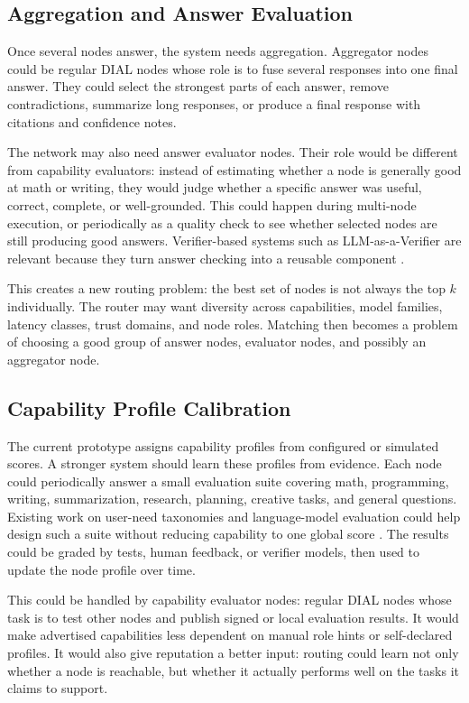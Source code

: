 \subsection{Aggregation and Answer Evaluation}

Once several nodes answer, the system needs aggregation. Aggregator nodes could
be regular DIAL nodes whose role is to fuse several responses into one final
answer. They could select the strongest parts of each answer, remove
contradictions, summarize long responses, or produce a final response with
citations and confidence notes.

The network may also need answer evaluator nodes. Their role would be different
from capability evaluators: instead of estimating whether a node is generally
good at math or writing, they would judge whether a specific answer was useful,
correct, complete, or well-grounded. This could happen during multi-node
execution, or periodically as a quality check to see whether selected nodes are
still producing good answers. Verifier-based systems such as LLM-as-a-Verifier
are relevant because they turn answer checking into a reusable component
\citep{kwok2026llmverifier}.

This creates a new routing problem: the best set of nodes is not always the top
\(k\) individually. The router may want diversity across capabilities, model
families, latency classes, trust domains, and node roles. Matching then becomes
a problem of choosing a good group of answer nodes, evaluator nodes, and
possibly an aggregator node.

\subsection{Capability Profile Calibration}

The current prototype assigns capability profiles from configured or simulated
scores. A stronger system should learn these profiles from evidence. Each node
could periodically answer a small evaluation suite covering math, programming,
writing, summarization, research, planning, creative tasks, and general
questions. Existing work on user-need taxonomies and language-model evaluation
could help design such a suite without reducing capability to one global score
\citep{shelby2025tuna,liang2022helm}. The results could be graded by tests,
human feedback, or verifier models, then used to update the node profile over
time.

This could be handled by capability evaluator nodes: regular DIAL nodes whose
task is to test other nodes and publish signed or local evaluation results. It
would make advertised capabilities less dependent on manual role hints or
self-declared profiles. It would also give reputation a better input: routing
could learn not only whether a node is reachable, but whether it actually
performs well on the tasks it claims to support.

